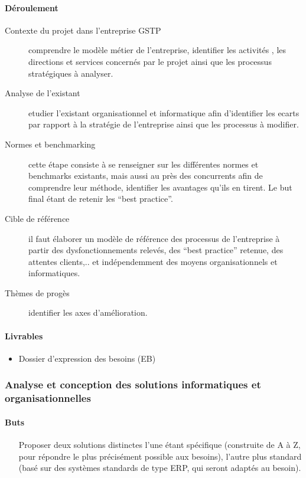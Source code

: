 \paragraph{Déroulement}
\begin{description}
    \item[Contexte du projet dans l’entreprise GSTP]{
        comprendre le modèle métier de l'entreprise, identifier les activités , les directions et services concernés par le projet ainsi que les processus stratégiques à analyser.
    }
    \item[Analyse de l’existant]{
        etudier l’existant organisationnel et informatique afin d’identifier les ecarts par rapport à la stratégie de l’entreprise ainsi que les processus à modifier. 
    }

    \item[Normes et benchmarking]{
        cette étape consiste à se renseigner sur les différentes normes et benchmarks existants, mais aussi au près des concurrents afin de comprendre leur méthode, identifier les avantages qu’ils en tirent.  Le but final étant de retenir les “best practice”.
    }

    \item[Cible de référence]{
        il faut élaborer un modèle de référence des processus de l’entreprise à partir des dysfonctionnements relevés, des “best practice” retenue, des attentes clients,..  et indépendemment  des moyens organisationnels et informatiques.
    }

    \item[Thèmes de progès]{
        identifier les axes d’amélioration.
    }
\end{description}

\paragraph{Livrables}
\begin{itemize}
    \item Dossier d’expression des besoins (EB)
\end{itemize}

\subsubsection{Analyse et conception des solutions informatiques et organisationnelles}

\paragraph{Buts}
\begin{itemize}
    \item[Proposer deux solutions distinctes]{
        l’une étant spécifique (construite de A à Z, pour répondre le plus précisément possible aux besoins), l’autre plus standard (basé sur des systèmes standards de type ERP, qui seront adaptés au besoin).
    }
\end{itemize}


